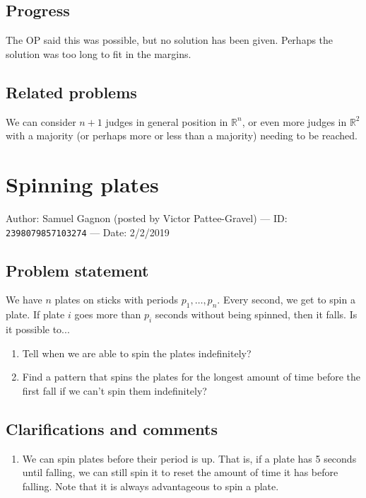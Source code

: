 \documentclass[10pt]{article}
\begin{document}
\subsection{Progress}

The OP said this was possible, but no solution has been given. Perhaps the solution was too long to fit in the margins.

\subsection{Related problems}

We can consider $n+1$ judges in general position in $\mathbb{R}^n$, or even more judges in $\mathbb{R}^2$ with a majority (or perhaps more or less than a majority) needing to be reached.

\pagebreak

\section{Spinning plates}

Author: Samuel Gagnon (posted by Victor Pattee-Gravel) --- ID: \verb`2398079857103274` --- Date: 2/2/2019

\subsection{Problem statement}

We have $n$ plates on sticks with periods $p_1,\ldots,p_n$. Every second, we get to spin a plate. If plate $i$ goes more than $p_i$ seconds without being spinned, then it falls. Is it possible to...

\begin{enumerate}
  \item Tell when we are able to spin the plates indefinitely?
  \item Find a pattern that spins the plates for the longest amount of time before the first fall if we can't spin them indefinitely?
\end{enumerate}

\subsection{Clarifications and comments}

\begin{enumerate}
  \item We can spin plates before their period is up. That is, if a plate has 5 seconds until falling, we can still spin it to reset the amount of time it has before falling. Note that it is always advantageous to spin a plate.
\end{enumerate}
\end{document}
